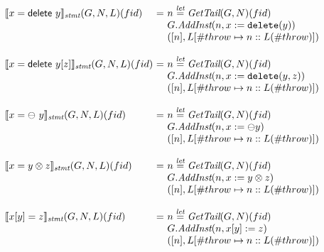 \[
\begin{array}{l@{}l@{~}l}
\transfun{\irdelete{x}{y}}_{\emph{stmt}}(G,N,L)(fid) & = &
	n \letval \GetTail(G,N)(fid)\\
	& & G.\emph{AddInst}(n,x := \TT{delete}(y))\\
	& & ([n],L[\#throw \mapsto n::L(\#throw)])\\
	& & \\

\transfun{\irdeleteobj{x}{y}{z}}_{\emph{stmt}}(G,N,L)(fid)\ & = &
	n \letval \GetTail(G,N)(fid)\\
	& & G.\emph{AddInst}(n,x := \TT{delete}(y,z))\\
	& & ([n],L[\#throw \mapsto n::L(\#throw)])\\
	& & \\

\transfun{\irunop{x}{y}}_{\emph{stmt}}(G,N,L)(fid) & = &
	n \letval \GetTail(G,N)(fid)\\
	& & G.\emph{AddInst}(n,x := \preop y)\\
	& & ([n],L[\#throw \mapsto n::L(\#throw)])\\
	& & \\

\transfun{\irbiop{x}{y}{z}}_{\emph{stmt}}(G,N,L)(fid) & = &
	n \letval \GetTail(G,N)(fid)\\
	& & G.\emph{AddInst}(n,x := y \inop z)\\
	& & ([n],L[\#throw \mapsto n::L(\#throw)])\\
	& & \\
	
\transfun{\irstore{x}{y}{z}}_{\emph{stmt}}(G,N,L)(fid) & = &
	n \letval \GetTail(G,N)(fid)\\
	& & G.\emph{AddInst}(n,x[y] := z)\\
	& & ([n],L[\#throw \mapsto n::L(\#throw)])\\
	& & \\


\end{array}\]
